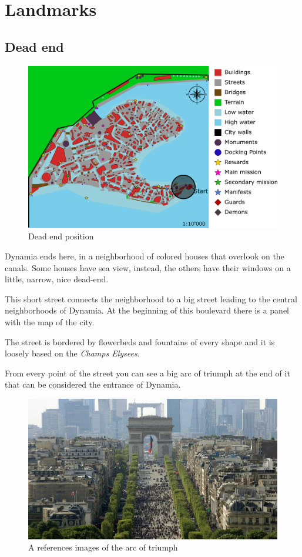 \section{Landmarks}

\subsection{Dead end}
\begin{figure}[H]
  \centering
  \includegraphics[width=\textwidth]{Images/Maps/dynamia_deadEnd}
  \caption{Dead end position}
\end{figure}

Dynamia ends here, in a neighborhood of colored houses that overlook on the canals. Some houses have sea view, instead, the others have their windows on a little, narrow, nice dead-end.

This short street connects the neighborhood to a big street leading to the central neighborhoods of Dynamia. At the beginning of this boulevard there is a panel with the map of the city.

The street is bordered by flowerbeds and fountains of every shape and it is loosely based on the \textit{Champs Elysees}.

From every point of the street you can see a big arc of triumph at the end of it that can be considered the entrance of Dynamia.

\begin{figure}[H]
  \centering
  \includegraphics[width=\textwidth]{Images/Landmarks/arcOfTriumph}
  \caption{A references images of the arc of triumph}
\end{figure}

